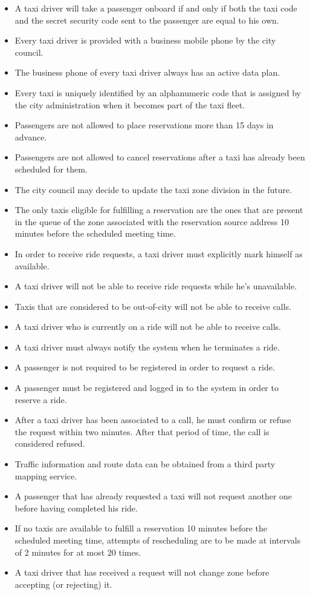 \begin{itemize}
\item A taxi driver will take a passenger onboard if and only if both the taxi code and the secret security code sent to the passenger are equal to his own.
\item Every taxi driver is provided with a business mobile phone by the city council.
\item The business phone of every taxi driver always has an active data plan.
\item Every taxi is uniquely identified by an alphanumeric code that is assigned by the city administration when it becomes part of the taxi fleet.
\item Passengers are not allowed to place reservations more than 15 days in advance. 
\item Passengers are not allowed to cancel reservations after a taxi has already been scheduled for them.
\item The city council may decide to update the taxi zone division in the future. 
\item The only taxis eligible for fulfilling a reservation are the ones that are present in the queue of the zone associated with the reservation source address 10 minutes before the scheduled meeting time.
\item In order to receive ride requests, a taxi driver must explicitly mark himself as available.
\item A taxi driver will not be able to receive ride requests while he's unavailable.
\item Taxis that are considered to be out-of-city will not be able to receive calls.
\item A taxi driver who is currently on a ride will not be able to receive calls.
\item A taxi driver must always notify the system when he terminates a ride. 
\item A passenger is not required to be registered in order to request a ride.
\item A passenger must be registered and logged in to the system in order to reserve a ride.
\item After a taxi driver has been associated to a call, he must confirm or refuse the request within two minutes. After that period of time, the call is considered refused. 
\item Traffic information and route data can be obtained from a third party mapping service.
\item A passenger that has already requested a taxi will not request another one before having completed his ride.
\item If no taxis are available to fulfill a reservation 10 minutes before the scheduled meeting time, attempts of rescheduling are to be made at intervals of 2 minutes for at most 20 times.
\item A taxi driver that has received a request will not change zone before accepting (or rejecting) it.
\end{itemize}